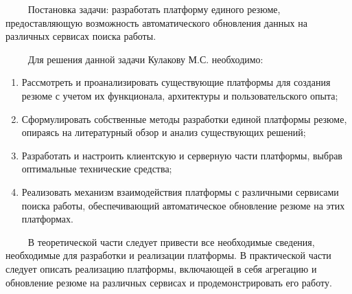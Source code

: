 \documentclass[master, och, assignment]{SCWorks}
\begin{document}


\maketitle

\secNumbering






\noindent
\begin{minipage}[t]{\dimexpr\textwidth-1cm\relax}
~~~~ Постановка задачи: разработать платформу единого резюме, предоставляющую возможность автоматического обновления данных на различных сервисах поиска работы. 

~~~~ Для решения данной задачи Кулакову М.С. необходимо:
\begin{enumerate}
    \item Рассмотреть и проанализировать существующие платформы для создания резюме с учетом их функционала, архитектуры и пользовательского опыта;
    \item Сформулировать собственные методы разработки единой платформы резюме, опираясь на литературный обзор и анализ существующих решений;
    \item Разработать и настроить клиентскую и серверную части платформы, выбрав оптимальные технические средства;
    \item Реализовать механизм взаимодействия платформы с различными сервисами поиска работы, обеспечивающий автоматическое обновление резюме на этих платформах.
\end{enumerate}

~~~~ В теоретической части следует привести все необходимые сведения, необходимые для разработки и реализации платформы. В практической части следует описать реализацию платформы, включающей в себя агрегацию и обновление резюме на различных сервисах и продемонстрировать его работу. 

\signatureline
\end{minipage}\hspace{1cm}
\end{document}
